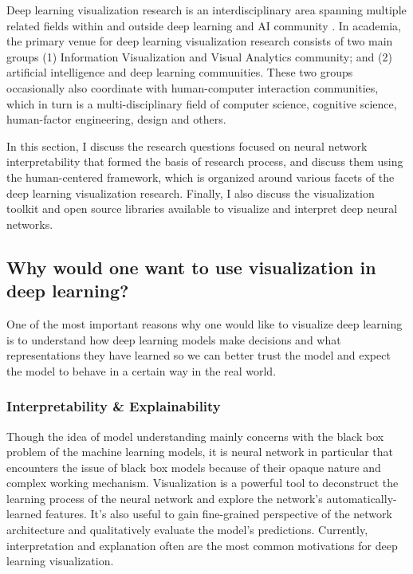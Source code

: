 Deep learning visualization research is an interdisciplinary area spanning multiple related fields within and outside deep learning and AI community \cite{Choo2018}. In academia, the primary venue for deep learning visualization research consists of two main groups (1) Information Visualization and Visual Analytics community; and (2) artificial intelligence and deep learning communities. These two groups occasionally also coordinate with human-computer interaction communities, which in turn is a multi-disciplinary field of computer science, cognitive science, human-factor engineering, design and others.

In this section, I discuss the research questions focused on neural network interpretability that formed the basis of research process, and discuss them using the human-centered framework, which is organized around various facets of the deep learning visualization research. Finally, I also discuss the visualization toolkit and open source libraries available to visualize and interpret deep neural networks.

\subsection*{Why would one want to use visualization in deep learning?}

One of the most important reasons why one would like to visualize deep learning is to understand how deep learning models make decisions and what representations they have learned so we can better trust the model and expect the model to behave in a certain way in the real world.

\subsubsection*{Interpretability \& Explainability }

Though the idea of model understanding mainly concerns with the black box problem of the machine learning models, it is neural network in particular that encounters the issue of black box models because of their opaque nature and complex working mechanism. Visualization is a powerful tool to deconstruct the learning process of the neural network and explore the network's automatically-learned features. It's also useful to gain fine-grained perspective of the network architecture and qualitatively evaluate the model’s predictions. Currently, interpretation and explanation often are the most common motivations for deep learning visualization.

